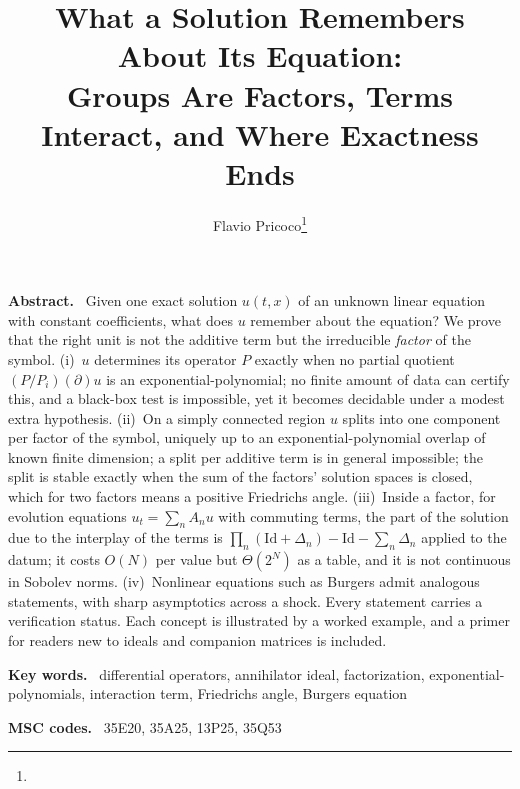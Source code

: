 \documentclass[11pt]{article}
\title{What a Solution Remembers About Its Equation:\\Groups Are Factors, Terms Interact, and Where Exactness Ends}
\author{Flavio Pricoco\thanks{\email{flaflapr@gmail.com}}}
\newenvironment{keywords}{\par\smallskip\noindent\textbf{Key words.}\ }{\par}
\newenvironment{MSCcodes}{\par\smallskip\noindent\textbf{MSC codes.}\ }{\par}
\renewenvironment{abstract}{\par\small\noindent\textbf{Abstract.}\ }{\par\normalsize}
\theoremstyle{plain}
\theoremstyle{definition}
\theoremstyle{remark}
\newcommand{\Id}{\mathrm{Id}}
\begin{document}
\maketitle

\begin{abstract}
Given one exact solution $u(t,x)$ of an unknown linear equation with constant coefficients, what does $u$ remember about the
equation? We prove that the right unit is not the additive term but the irreducible \emph{factor} of the symbol. (i)~$u$
determines its operator $P$ exactly when no partial quotient $(P/P_i)(\partial)u$ is an exponential-polynomial; no finite amount of
data can certify this, and a black-box test is impossible, yet it becomes decidable under a modest extra hypothesis. (ii)~On a simply connected region $u$ splits into one
component per factor of the symbol, uniquely up to an exponential-polynomial overlap of known finite dimension; a split per additive term is in general impossible; the split is
stable exactly when the sum of the factors' solution spaces is closed, which for two factors means a positive Friedrichs angle. (iii)~Inside a factor, for evolution equations $u_t=\sum_nA_nu$ with commuting terms, the part of the solution
due to the interplay of the terms is $\prod_n(\Id+\Delta_n)-\Id-\sum_n\Delta_n$ applied to the datum; it costs $O(N)$ per value but $\Theta(2^N)$ as a table, and it
is not continuous in Sobolev norms. (iv)~Nonlinear equations such as Burgers admit analogous statements, with sharp asymptotics across a shock. Every statement carries a verification status.
Each concept is illustrated by a worked example, and a primer for readers new to ideals and companion matrices is included.
\end{abstract}

\begin{keywords}
differential operators, annihilator ideal, factorization, exponential-polynomials, interaction term, Friedrichs angle, Burgers equation
\end{keywords}

\begin{MSCcodes}
35E20, 35A25, 13P25, 35Q53
\end{MSCcodes}
\end{document}
